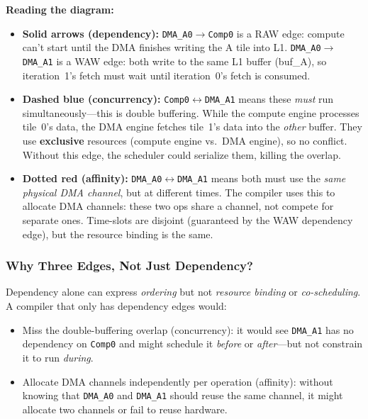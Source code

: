 \documentclass[11pt,a4paper]{article}
\begin{document}
\textbf{Reading the diagram:}
\begin{itemize}[leftmargin=2em]
  \item \textbf{Solid arrows (dependency):}
    \texttt{DMA\_A0}$\rightarrow$\texttt{Comp0} is a RAW edge: compute can't
    start until the DMA finishes writing the A tile into L1.
    \texttt{DMA\_A0}$\rightarrow$\texttt{DMA\_A1} is a WAW edge: both write to
    the same L1 buffer (buf\_A), so iteration~1's fetch must wait until
    iteration~0's fetch is consumed.

  \item \textbf{Dashed blue (concurrency):}
    \texttt{Comp0}$\leftrightarrow$\texttt{DMA\_A1} means these \emph{must}
    run simultaneously---this is double buffering. While the compute engine
    processes tile~0's data, the DMA engine fetches tile~1's data into the
    \emph{other} buffer. They use \textbf{exclusive} resources (compute engine
    vs.\ DMA engine), so no conflict. Without this edge, the scheduler could
    serialize them, killing the overlap.

  \item \textbf{Dotted red (affinity):}
    \texttt{DMA\_A0}$\leftrightarrow$\texttt{DMA\_A1} means both must use the
    \emph{same physical DMA channel}, but at different times. The compiler uses
    this to allocate DMA channels: these two ops share a channel, not compete for
    separate ones. Time-slots are disjoint (guaranteed by the WAW dependency
    edge), but the resource binding is the same.
\end{itemize}

\subsubsection{Why Three Edges, Not Just Dependency?}

Dependency alone can express \emph{ordering} but not \emph{resource binding} or
\emph{co-scheduling}. A compiler that only has dependency edges would:
\begin{itemize}[leftmargin=2em]
  \item Miss the double-buffering overlap (concurrency): it would see
    \texttt{DMA\_A1} has no dependency on \texttt{Comp0} and might schedule it
    \emph{before} or \emph{after}---but not constrain it to run \emph{during}.
  \item Allocate DMA channels independently per operation (affinity): without
    knowing that \texttt{DMA\_A0} and \texttt{DMA\_A1} should reuse the same
    channel, it might allocate two channels or fail to reuse hardware.
\end{itemize}
\end{document}
